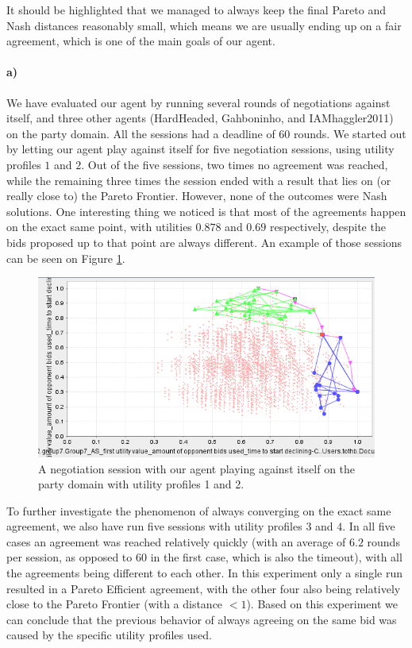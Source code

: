 \documentclass{article}
\begin{document}
\begin{enumerate}
It should be highlighted that we managed to always keep the final Pareto and Nash distances reasonably small, which means we are usually ending up on a fair agreement, which is one of the main goals of our agent.

\paragraph{a)}We have evaluated our agent by running several rounds of negotiations against itself, and three other agents (HardHeaded, Gahboninho, and IAMhaggler2011) on the party domain. All the sessions had a deadline of 60 rounds. We started out by letting our agent play against itself for five negotiation sessions, using utility profiles $1$ and $2$. Out of the five sessions, two times no agreement was reached, while the remaining three times the session ended with a result that lies on (or really close to) the Pareto Frontier. However, none of the outcomes were Nash solutions. One interesting thing we noticed is that most of the agreements happen on the exact same point, with utilities $0.878$ and $0.69$ respectively, despite the bids proposed up to that point are always different. An example of those sessions can be seen on Figure \ref{fig:party-vs-agent007}.

\begin{figure}[h!]
    \centering
    \includegraphics[width=350pt]{party-vs-agent007.PNG}
    \caption{A negotiation session with our agent playing against itself on the party domain with utility profiles 1 and 2.}
    \label{fig:party-vs-agent007}
\end{figure}

To further investigate the phenomenon of always converging on the exact same agreement, we also have run five sessions with utility profiles $3$ and $4$. In all five cases an agreement was reached relatively quickly (with an average of $6.2$ rounds per session, as opposed to $60$ in the first case, which is also the timeout), with all the agreements being different to each other. In this experiment only a single run resulted in a Pareto Efficient agreement, with the other four also being relatively close to the Pareto Frontier (with a distance $<1$). Based on this experiment we can conclude that the previous behavior of always agreeing on the same bid was caused by the specific utility profiles used.


\end{enumerate}
\end{document}
